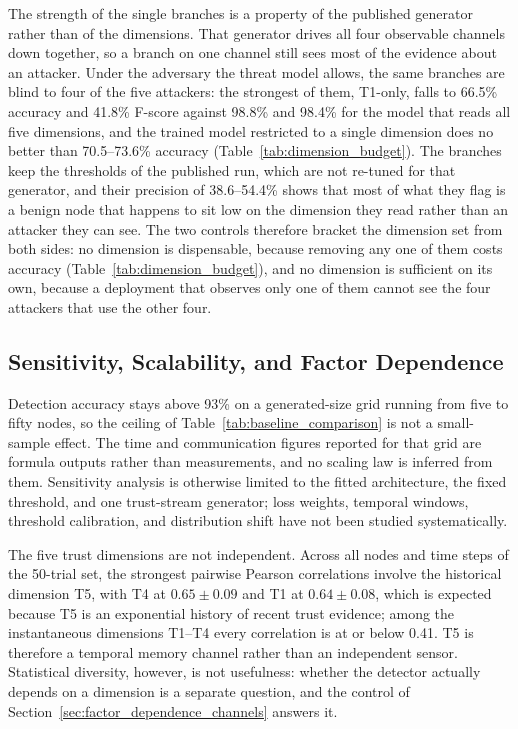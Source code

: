 \documentclass[notspecified,article,submit,moreauthors]{Definitions/mdpi}
\begin{document}
The strength of the single branches is a property of the published generator rather than of the dimensions. That generator drives all four observable channels down together, so a branch on one channel still sees most of the evidence about an attacker. Under the adversary the threat model allows, the same branches are blind to four of the five attackers: the strongest of them, T1-only, falls to 66.5\% accuracy and 41.8\% F-score against 98.8\% and 98.4\% for the model that reads all five dimensions, and the trained model restricted to a single dimension does no better than 70.5--73.6\% accuracy (Table~\ref{tab:dimension_budget}). The branches keep the thresholds of the published run, which are not re-tuned for that generator, and their precision of 38.6--54.4\% shows that most of what they flag is a benign node that happens to sit low on the dimension they read rather than an attacker they can see. The two controls therefore bracket the dimension set from both sides: no dimension is dispensable, because removing any one of them costs accuracy (Table~\ref{tab:dimension_budget}), and no dimension is sufficient on its own, because a deployment that observes only one of them cannot see the four attackers that use the other four.


\subsection{Sensitivity, Scalability, and Factor Dependence}
\label{sec:factor_dependence}
Detection accuracy stays above 93\% on a generated-size grid running from five to fifty nodes, so the ceiling of Table~\ref{tab:baseline_comparison} is not a small-sample effect. The time and communication figures reported for that grid are formula outputs rather than measurements, and no scaling law is inferred from them. Sensitivity analysis is otherwise limited to the fitted architecture, the fixed threshold, and one trust-stream generator; loss weights, temporal windows, threshold calibration, and distribution shift have not been studied systematically.

The five trust dimensions are not independent. Across all nodes and time steps of the 50-trial set, the strongest pairwise Pearson correlations involve the historical dimension T5, with T4 at $0.65 \pm 0.09$ and T1 at $0.64 \pm 0.08$, which is expected because T5 is an exponential history of recent trust evidence; among the instantaneous dimensions T1--T4 every correlation is at or below 0.41. T5 is therefore a temporal memory channel rather than an independent sensor. Statistical diversity, however, is not usefulness: whether the detector actually depends on a dimension is a separate question, and the control of Section~\ref{sec:factor_dependence_channels} answers it.
\end{document}
